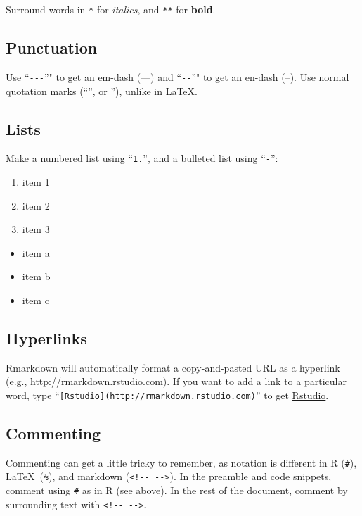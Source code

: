 \documentclass[11pt,]{article}
\providecommand{\tightlist}{%
  \setlength{\itemsep}{0pt}\setlength{\parskip}{0pt}}
\begin{document}
Surround words in \texttt{*} for \emph{italics}, and \texttt{**} for
\textbf{bold}.

\subsection{Punctuation}\label{punctuation}

Use ``\texttt{-\/-\/-}''" to get an em-dash (---) and ``\texttt{-\/-}''"
to get an en-dash (--). Use normal quotation marks (``'', or ''), unlike
in \LaTeX.

\subsection{Lists}\label{lists}

Make a numbered list using ``\texttt{1.}'', and a bulleted list using
``\texttt{-}'':

\begin{enumerate}
\def\labelenumi{\arabic{enumi}.}
\tightlist
\item
  item 1
\item
  item 2
\item
  item 3
\end{enumerate}

\begin{itemize}
\tightlist
\item
  item a
\item
  item b
\item
  item c
\end{itemize}

\subsection{Hyperlinks}\label{hyperlinks}

Rmarkdown will automatically format a copy-and-pasted URL as a hyperlink
(e.g., \url{http://rmarkdown.rstudio.com}). If you want to add a link to
a particular word, type
``\texttt{{[}Rstudio{]}(http://rmarkdown.rstudio.com)}'' to get
\href{http://rmarkdown.rstudio.com}{Rstudio}.

\subsection{Commenting}\label{commenting}

Commenting can get a little tricky to remember, as notation is different
in R (\texttt{\#}), \LaTeX~(\texttt{\%}), and markdown
(\texttt{\textless{}!-\/-\ -\/-\textgreater{}}). In the preamble and
code snippets, comment using \texttt{\#} as in R (see above). In the
rest of the document, comment by surrounding text with
\texttt{\textless{}!-\/-\ -\/-\textgreater{}}.
\end{document}
